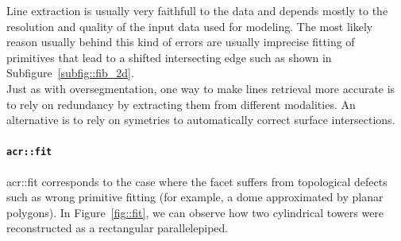                 Line extraction is usually very faithfull to the data and depends mostly to the resolution and quality of the input data used for modeling.
                The most likely reason usually behind this kind of errors are usually imprecise fitting of primitives that lead to a shifted intersecting edge such as shown in Subfigure~\ref{subfig::fib_2d}.\\

                Just as with oversegmentation, one way to make lines retrieval more accurate is to rely on redundancy by extracting them from different modalities.
                An alternative is to rely on symetries \addref to automatically correct surface intersections.

            \paragraph{\texttt{\acrlong*{acr::fit}}}

                \gls{acr::fit} corresponds to the case where the facet suffers from topological defects such as wrong primitive fitting (for example, a dome approximated by planar polygons).
                In Figure~\ref{fig::fit}, we can observe how two cylindrical towers were reconstructed as a rectangular parallelepiped.\\

                \begin{figure}[H]
                    \centering
                \end{figure}

